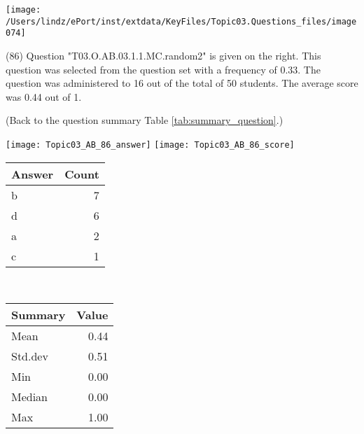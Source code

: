 \documentclass[12pt,english,nohyper]{tufte-handout}\usepackage[]{graphicx}\usepackage[]{color}
\begin{document}
\vspace{4cm}\begin{marginfigure}\texttt{[image: /Users/lindz/ePort/inst/extdata/KeyFiles/Topic03.Questions\_files/image074]}\end{marginfigure}\vspace{-4cm} (86) Question "T03.O.AB.03.1.1.MC.random2" is given on the right. This question was selected from the question set with a frequency of 0.33. The question was administered to 16 out of the total of 50 students. The average score was 0.44 out of 1.

 (Back to the question summary Table \ref{tab:summary_question}.)

\begin{center} \texttt{[image: Topic03\_AB\_86\_answer]} \texttt{[image: Topic03\_AB\_86\_score]} \end{center} 

\begin{center}%
\begin{tabular}{lr}
  \hline
Answer & Count \\ 
  \hline
b &   7 \\ 
  d &   6 \\ 
  a &   2 \\ 
  c &   1 \\ 
   \hline
\end{tabular}
~~~~~~~~%
\begin{tabular}{lr}
  \hline
Summary & Value \\ 
  \hline
Mean & 0.44 \\ 
  Std.dev & 0.51 \\ 
  Min & 0.00 \\ 
  Median & 0.00 \\ 
  Max & 1.00 \\ 
   \hline
\end{tabular}
\end{center}\newpage
\end{document}
